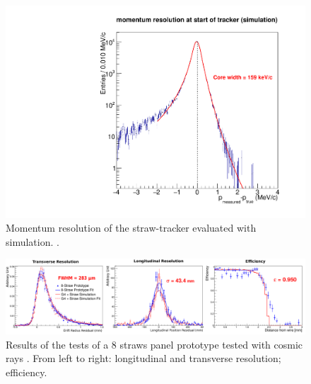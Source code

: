 \documentclass[12pt,a4paper,openright, oneside, titlepage]{book} %
\begin{document}
\begin{figure}[h!]
\centering
\includegraphics[scale=0.3]{Tracker_resolution}
\caption[Tracker simulated resolution]{Momentum resolution of the straw-tracker evaluated with  simulation. \cite{Giovannella}.}
\label{_Tracker_resolution}
\end{figure}

\begin{figure}[h!]
\centering
\includegraphics[scale=0.7]{Tracker_prototype}
\caption[Tracker prototype results]{Results of the tests of a 8 straws panel prototype tested with cosmic rays \cite{Giovannella}. 
From left to right: longitudinal and transverse resolution; efficiency.}
\label{_Tracker_prototype}
\end{figure}
\end{document}
